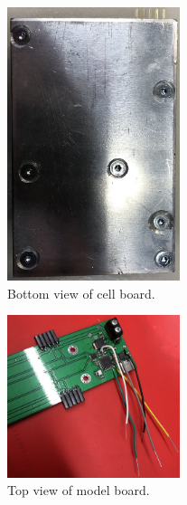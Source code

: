 \begin{figure}[h!]
    \centering
    \includegraphics[width=0.45\textwidth]{CellBoardBottom.jpg}
    \caption{Bottom view of cell board.}
    \label{fig:CellBoardBottom}
\end{figure}

\begin{figure}[h!]
    \centering
    \includegraphics[width=0.45\textwidth]{ModelBoardTop.jpg}
    \caption{Top view of model board.}
    \label{fig:ModelBoardTop}
\end{figure}
\FloatBarrier